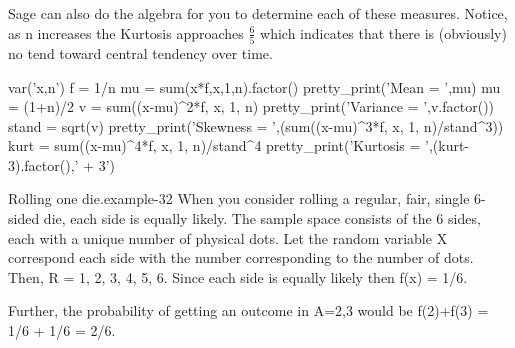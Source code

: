 \documentclass[10pt,]{book}
\numberwithin{equation}{section}
\begin{document}
%
\par
\hypertarget{p-800}{}%
Sage can also do the algebra for you to determine each of these measures. Notice, as n increases the Kurtosis approaches \(\frac{6}{5}\) which indicates that there is (obviously) no tend toward central tendency over time.%
\par
\hypertarget{p-801}{}%
\leavevmode%
\begin{sageinput}
var('x,n')
f = 1/n
mu = sum(x*f,x,1,n).factor()
pretty_print('Mean = ',mu)
mu = (1+n)/2
v = sum((x-mu)^2*f, x, 1, n)
pretty_print('Variance = ',v.factor())
stand = sqrt(v)
pretty_print('Skewness =  ',(sum((x-mu)^3*f, x, 1, n)/stand^3))
kurt = sum((x-mu)^4*f, x, 1, n)/stand^4
pretty_print('Kurtosis = ',(kurt-3).factor(),' + 3')
\end{sageinput}
%
\par
\hypertarget{p-802}{}%
\begin{example}{Rolling one die.}{example-32}%
\hypertarget{p-803}{}%
When you consider rolling a regular, fair, single 6-sided die, each side is equally likely. The sample space consists of the 6 sides, each with a unique number of physical dots. Let the random variable X correspond each side with the number corresponding to the number of dots. Then, R = {1, 2, 3, 4, 5, 6}.  Since each side is equally likely then f(x) = 1/6.%
\par
\hypertarget{p-804}{}%
Further, the probability of getting an outcome in A={2,3} would be f(2)+f(3) = 1/6 + 1/6 = 2/6.%
\end{example}
%
%
%
\typeout{************************************************}
\typeout{************************************************}
%
\end{document}
